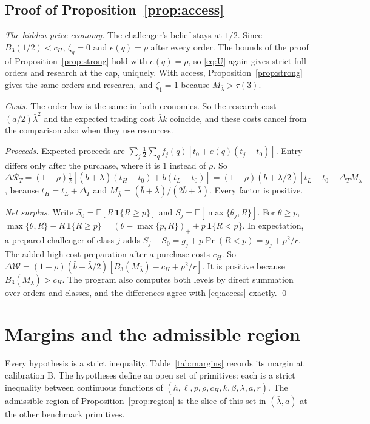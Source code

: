 \documentclass[12pt]{article}
\theoremstyle{definition}
\theoremstyle{remark}
\newcommand{\E}{\mathbb E}
\newcommand{\DT}{\Delta_T}
\newcommand{\lb}{\bar\lambda}
\begin{document}
\subsection{Proof of Proposition~\ref{prop:access}}

\emph{The hidden-price economy.} The challenger's belief stays at $1/2$. Since $B_3(1/2)<c_H$, $\zeta_q=0$ and
$e(q)=\rho$ after every order. The bounds of the proof of Proposition~\ref{prop:strong} hold with $e(q)=\rho$, so
\eqref{eq:U} again gives strict full orders and research at the cap, uniquely. With access,
Proposition~\ref{prop:strong} gives the same orders and research, and $\zeta_1=1$ because $M_{\lb}>\tau(3)$.

\emph{Costs.} The order law is the same in both economies. So the research cost $(a/2)\lb^2$ and the expected trading
cost $\lb k$ coincide, and these costs cancel from the comparison also when they use resources.

\emph{Proceeds.} Expected proceeds are $\sum_j\frac12\sum_qf_j(q)[t_0+e(q)(t_j-t_0)]$. Entry differs only after the
purchase, where it is $1$ instead of $\rho$. So
$\Delta\mathcal R_T=(1-\rho)\frac12[(\bar b+\lb)(t_H-t_0)+\bar b(t_L-t_0)]=(1-\rho)(\bar b+\lb/2)[t_L-t_0+\DT M_{\lb}]$,
because $t_H=t_L+\DT$ and $M_{\lb}=(\bar b+\lb)/(2\bar b+\lb)$. Every factor is positive.

\emph{Net surplus.} Write $S_0=\E[R\,\mathbf 1\{R\ge p\}]$ and $S_j=\E[\max\{\theta_j,R\}]$. For $\theta\ge p$,
$\max\{\theta,R\}-R\,\mathbf 1\{R\ge p\}=(\theta-\max\{p,R\})_++p\,\mathbf 1\{R<p\}$. In expectation, a prepared
challenger of class $j$ adds $S_j-S_0=g_j+p\Pr(R<p)=g_j+p^2/r$. The added high-cost
preparation after a purchase costs $c_H$. So
$\Delta\mathcal W=(1-\rho)(\bar b+\lb/2)[B_3(M_{\lb})-c_H+p^2/r]$. It is positive because
$B_3(M_{\lb})>c_H$. The program also computes both levels by direct summation over orders and classes, and the
differences agree with \eqref{eq:access} exactly. \qed

\section{Margins and the admissible region}\label{sec:margins}

Every hypothesis is a strict inequality. Table~\ref{tab:margins} records its margin at calibration B. The
hypotheses define an open set of primitives: each is a strict inequality between continuous functions of
$(h,\ell,p,\rho,c_H,k,\beta,\lb,a,r)$. The admissible region of Proposition~\ref{prop:region} is the slice of this set
in $(\lb,a)$ at the other benchmark primitives.
\end{document}

